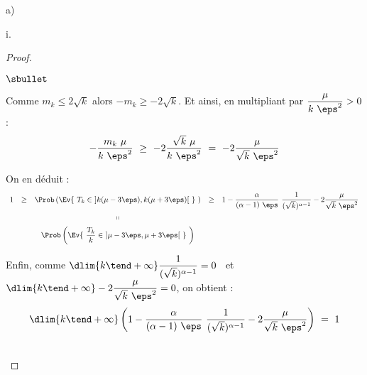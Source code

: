 \begin{liste}{a)}
\begin{nonoliste}{i.}
\begin{proof}
\begin{noliste}{$\sbullet$}
      \item Comme $m_k \leq 2 \sqrt{k}$ alors $-m_k \geq - 2
        \sqrt{k}$. Et ainsi, en multipliant par $\dfrac{\mu}{k \
          \eps^2} > 0$ :
        \[
        -\dfrac{m_k \ \mu}{k \ \eps^2} \ \geq \ - 2 \dfrac{\sqrt{k} \
          \mu}{k \ \eps^2} \ = \ -2 \dfrac{\mu}{\sqrt{k} \ \eps^2}
        \]

      \item On en déduit : 
        \[
        \begin{array}{ccccc}
          1 & \geq & \Prob\left(\Ev{\ T_{k} \in \ ]k(\mu - 3 \eps), k(\mu + 3
              \eps)[ \ } \ \right) & \geq & 1 - \dfrac{\alpha}{(\alpha -
            1) \ \eps} \ \dfrac{1}{(\sqrt{k})^{\alpha - 1}} - 2
          \dfrac{\mu}{\sqrt{k} \ \eps^2}
          \\[.4cm]
          & & \shortparallel 
          \\[.2cm]
          & & \Prob\left(\Ev{\ \dfrac{T_{k}}{k} \in \ ]\mu - 3 \eps, \mu + 3
              \eps[ \ } \ \right)
        \end{array}
        \]

      \item Enfin, comme $\dlim{k \tend +\infty}
        \dfrac{1}{(\sqrt{k})^{\alpha - 1}} = 0$ \ et \ $\dlim{k \tend
          +\infty} - 2 \dfrac{\mu}{\sqrt{k} \ \eps^2} = 0$, on obtient
        :
        \[
        \dlim{k \tend +\infty} \left(1 - \dfrac{\alpha}{(\alpha - 1) \
            \eps} \ \dfrac{1}{(\sqrt{k})^{\alpha - 1}} - 2
          \dfrac{\mu}{\sqrt{k} \ \eps^2} \right) \ = \ 1
        \]
      \end{noliste}
      \conc{On en conclut, par théorème d'encadrement : $\dlim{k \tend
          +\infty} \Prob\left(\Ev{\ \dfrac{T_{k}}{k} \in \ ]\mu - 3
            \eps, \mu + 3 \eps[ \ } \ \right) \ = \ 1$}~\\[-.8cm]
    \end{proof}
  \end{nonoliste}
\end{liste}




